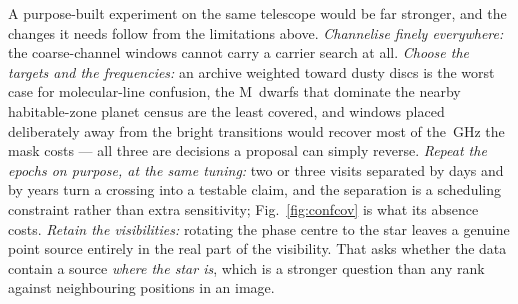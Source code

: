 A purpose-built experiment on the same telescope would be far stronger, and
the changes it needs follow from the limitations above. \emph{Channelise
finely everywhere:} the \NCoarse{} coarse-channel windows cannot carry a
carrier search at all.
\emph{Choose the targets and the frequencies:} an archive weighted toward
dusty discs is the worst case for molecular-line confusion, the M~dwarfs that
dominate the nearby habitable-zone planet census are the least covered, and
windows placed deliberately away from the bright transitions would recover
most of the \FrMaskLostGHz\,GHz the mask costs --- all three are decisions a
proposal can simply reverse. \emph{Repeat the epochs on purpose, at the same
tuning:} two or three visits separated by days and by years turn a crossing
into a testable claim, and the separation is a scheduling constraint rather
than extra sensitivity; Fig.~\ref{fig:confcov} is what its absence costs.
\emph{Retain the visibilities:} rotating the phase centre to the star leaves a
genuine point source entirely in the real part of the visibility. That asks
whether the data contain a source \emph{where the star is}, which is a
stronger question than any rank
against neighbouring positions in an image.

